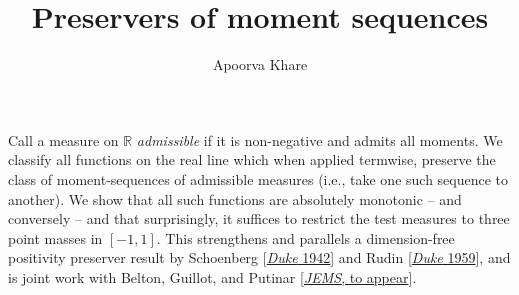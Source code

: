 \documentclass[a4paper]{amsart}
\date{}
\begin{document}
\title{Preservers of moment sequences}
\author{Apoorva Khare} %
\address{Indian Institute of Science; and Analysis \& Probability
Research Group (Bangalore, India)} %

\maketitle


Call a measure on $\mathbb{R}$ \textit{admissible} if it is non-negative
and admits all moments. We classify all functions on the real line which
when applied termwise, preserve the class of moment-sequences of
admissible measures (i.e., take one such sequence to another). We show
that all such functions are absolutely monotonic -- and conversely -- and
that surprisingly, it suffices to restrict the test measures to three
point masses in $[-1,1]$. This strengthens and parallels a dimension-free
positivity preserver result by Schoenberg
[\href{http://dx.doi.org/10.1215/S0012-7094-42-00908-6}{{\em Duke} 1942}]
and Rudin
[\href{http://dx.doi.org/10.1215/S0012-7094-59-02659-6}{{\em Duke}
1959}], and is joint work with Belton, Guillot, and Putinar
[\href{http://dx.doi.org/10.4171/jems/1145}{{\em JEMS}, to appear}].
\end{document}
